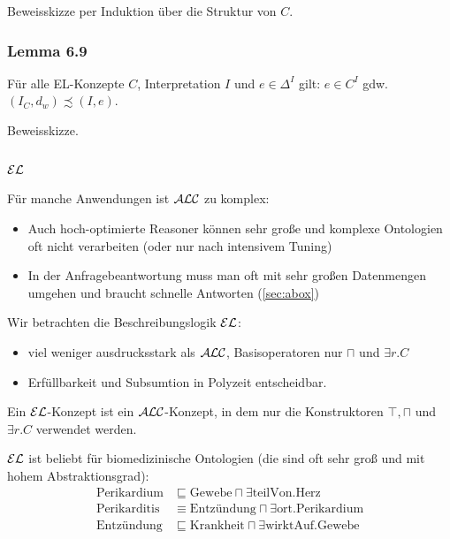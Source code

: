 Beweisskizze per Induktion über die Struktur von $C$.

\hypertarget{lemma-6.9}{\subsubsection{Lemma 6.9}\label{lemma-6.9}}

Für alle EL-Konzepte $C$, Interpretation $I$ und
$e \in \Delta^{I}$ gilt: $e \in C^{I}$ gdw.
$\left( I_{C},d_{w} \right) \precsim \left( I,e \right)$.

Beweisskizze.
\subsection{\texorpdfstring{$\EL$}{EL}}\label{sec:el}

Für manche Anwendungen ist $\mathcal{A}\mathcal{L}\mathcal{C}$ zu komplex:
\begin{itemize}
    \item Auch hoch-optimierte Reasoner können sehr große und komplexe Ontologien oft nicht verarbeiten (oder nur nach intensivem Tuning)
    \item In der Anfragebeantwortung muss man oft mit sehr großen Datenmengen umgehen und braucht schnelle Antworten (\autoref{sec:abox})
\end{itemize}

Wir betrachten die Beschreibungslogik $\EL$:
\begin{itemize}
    \item viel weniger ausdrucksstark als $\mathcal{A}\mathcal{L}\mathcal{C}$, Basisoperatoren nur $\sqcap$ und $\exists r.C$
    \item Erfüllbarkeit und Subsumtion in Polyzeit entscheidbar.
\end{itemize}

\begin{definition}[$\EL$]
Ein $\EL$-Konzept ist ein $\mathcal{A}\mathcal{L}\mathcal{C}$-Konzept, in dem nur die Konstruktoren
$\top, \sqcap$ und $\exists r.C$ verwendet werden.
\end{definition}

$\EL$ ist beliebt für biomedizinische Ontologien (die sind oft sehr groß und mit hohem Abstraktionsgrad):
\begin{align*}
    \text{Perikardium} &\sqsubseteq \text{Gewebe} \sqcap \exists \text{teilVon}.\text{Herz}\\
    \text{Perikarditis} &\equiv \text{Entzündung} \sqcap \exists \text{ort}.\text{Perikardium}\\
    \text{Entzündung} & \sqsubseteq \text{Krankheit} \sqcap \exists \text{wirktAuf}.\text{Gewebe}
\end{align*}

